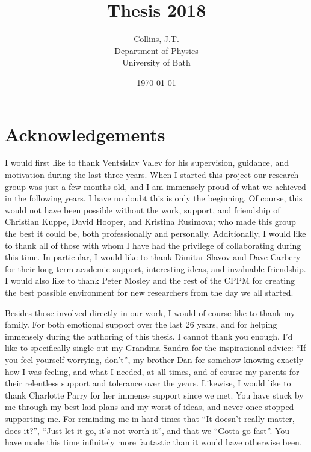 \documentclass[11pt,a4paper,final]{report}
\title{Thesis 2018}
\author{
	Collins, J.T. \\ 
	Department of Physics\\
	University of Bath\\
}
\date{\today}
\begin{document}
\begin{titlepage}
    
\end{titlepage}

\begin{abstract}
	\setcounter{page}{0}  %
    
\end{abstract}
\clearpage

\clearpage 
\tableofcontents
\clearpage


\chapter*{Acknowledgements}
I would first like to thank Ventsislav Valev for his supervision, guidance, and motivation during the last three years. When I started this project our research group was just a few months old, and I am immensely proud of what we achieved in the following years. I have no doubt this is only the beginning. Of course, this would not have been possible without the work, support, and friendship of Christian Kuppe, David Hooper, and Kristina Rusimova; who made this group the best it could be, both professionally and personally. Additionally, I would like to thank all of those with whom I have had the privilege of collaborating during this time. In particular, I would like to thank Dimitar Slavov and Dave Carbery for their long-term academic support, interesting ideas, and invaluable friendship. I would also like to thank Peter Mosley and the rest of the CPPM for creating the best possible environment for new researchers from the day we all started. 

Besides those involved directly in our work, I would of course like to thank my family. For both emotional support over the last 26 years, and for helping immensely during the authoring of this thesis. I cannot thank you enough. I'd like to specifically single out my Grandma Sandra for the inspirational advice: ``If you feel yourself worrying, don't'', my brother Dan for somehow knowing exactly how I was feeling, and what I needed, at all times, and of course my parents for their relentless support and tolerance over the years. Likewise, I would like to thank Charlotte Parry for her immense support since we met. You have stuck by me through my best laid plans and my worst of ideas, and never once stopped supporting me. For reminding me in hard times that ``It doesn't really matter, does it?'', ``Just let it go, it's not worth it'', and that we ``Gotta go fast''. You have made this time infinitely more fantastic than it would have otherwise been.
\end{document}

